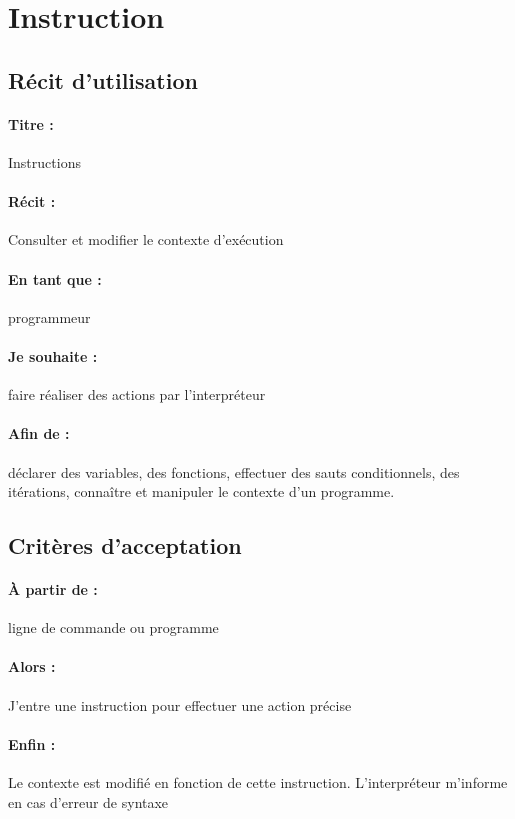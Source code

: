 \section{Instruction}

    \subsection*{Récit d'utilisation}

    \paragraph{Titre : } Instructions
    \paragraph{Récit : } Consulter et modifier le contexte d'exécution
    \paragraph{En tant que : } programmeur
    \paragraph{Je souhaite : } faire réaliser des actions par l'interpréteur
    \paragraph{Afin de : } déclarer des variables, des fonctions, effectuer des
    sauts conditionnels, des itérations, connaître et manipuler le contexte
    d'un programme.

    \subsection*{Critères d'acceptation}

    \paragraph{À partir de : } ligne de commande ou programme
    \paragraph{Alors : } J'entre une instruction pour effectuer une action précise
    \paragraph{Enfin : } Le contexte est modifié en fonction de cette instruction.
    L'interpréteur m'informe en cas d'erreur de syntaxe